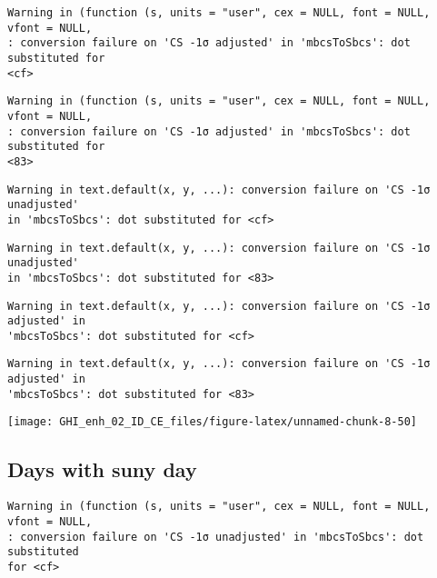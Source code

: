\documentclass[
  10pt,
  a4paper,oneside]{article}
\begin{document}
\begin{verbatim}
Warning in (function (s, units = "user", cex = NULL, font = NULL, vfont = NULL,
: conversion failure on 'CS -1σ adjusted' in 'mbcsToSbcs': dot substituted for
<cf>
\end{verbatim}

\begin{verbatim}
Warning in (function (s, units = "user", cex = NULL, font = NULL, vfont = NULL,
: conversion failure on 'CS -1σ adjusted' in 'mbcsToSbcs': dot substituted for
<83>
\end{verbatim}

\begin{verbatim}
Warning in text.default(x, y, ...): conversion failure on 'CS -1σ unadjusted'
in 'mbcsToSbcs': dot substituted for <cf>
\end{verbatim}

\begin{verbatim}
Warning in text.default(x, y, ...): conversion failure on 'CS -1σ unadjusted'
in 'mbcsToSbcs': dot substituted for <83>
\end{verbatim}

\begin{verbatim}
Warning in text.default(x, y, ...): conversion failure on 'CS -1σ adjusted' in
'mbcsToSbcs': dot substituted for <cf>
\end{verbatim}

\begin{verbatim}
Warning in text.default(x, y, ...): conversion failure on 'CS -1σ adjusted' in
'mbcsToSbcs': dot substituted for <83>
\end{verbatim}

\begin{center}\texttt{[image: GHI\_enh\_02\_ID\_CE\_files/figure-latex/unnamed-chunk-8-50]} \end{center}

\FloatBarrier

\hypertarget{days-with-suny-day}{%
\subsection{Days with suny day}\label{days-with-suny-day}}

\begin{verbatim}
Warning in (function (s, units = "user", cex = NULL, font = NULL, vfont = NULL,
: conversion failure on 'CS -1σ unadjusted' in 'mbcsToSbcs': dot substituted
for <cf>
\end{verbatim}
\end{document}
